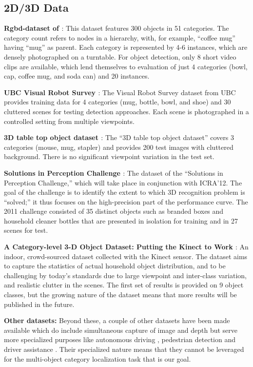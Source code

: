 \subsection{2D/3D Data}
{\bf Rgbd-dataset of \cite{Lai2011}}:
This dataset features 300 objects in 51 categories.
The category count refers to nodes in a hierarchy, with, for example, ``coffee mug'' having ``mug'' as parent.
Each category is represented by 4-6 instances, which are densely photographed on a turntable.
For object detection, only 8 short video clips are available, which lend themselves to evaluation of just 4 categories (bowl, cap, coffee mug, and soda can) and 20 instances.

{\bf UBC Visual Robot Survey \cite{Helmer2010}}:
The Visual Robot Survey dataset from UBC provides training data for 4 categories (mug, bottle, bowl, and shoe) and 30 cluttered scenes for testing detection approaches.
Each scene is photographed in a controlled setting from multiple viewpoints.

{\bf 3D table top object dataset \cite{Sun2010}}:
The ``3D table top object dataset'' covers 3 categories (mouse, mug, stapler) and provides 200 test images with cluttered background.
There is no significant viewpoint variation in the test set.

{\bf Solutions in Perception Challenge \cite{SIPC2011}}:
The dataset of the ``Solutions in Perception Challenge,'' which will take place in conjunction with ICRA'12.
The goal of the challenge is to identify the extent to which 3D recognition problem is ``solved;'' it thus focuses on the high-precision part of the performance curve.
The 2011 challenge consisted of 35 distinct objects such as branded boxes and household cleaner bottles that are presented in isolation for training and in 27 scenes for test.

{\bf A Category-level 3-D Object Dataset: Putting the Kinect to Work \cite{Janoch2011}}:
An indoor, crowd-sourced dataset collected with the Kinect sensor.
The dataset aims to capture the statistics of actual household object distribution, and to be challenging by today's standards due to large viewpoint and inter-class variation, and realistic clutter in the scenes.
The first set of results is provided on 9 object classes, but the growing nature of the dataset means that more results will be published in the future.

{\bf Other datasets:} Beyond these, a couple of other datasets have been made available which do include simultaneous capture of image and depth but serve more specialized purposes like autonomous driving \cite{ford_dataset}, pedestrian detection \cite{leibe10ijrr} and driver assistance \cite{walk10eccv}.
Their specialized nature means that they cannot be leveraged for the multi-object category localization task that is our goal.
